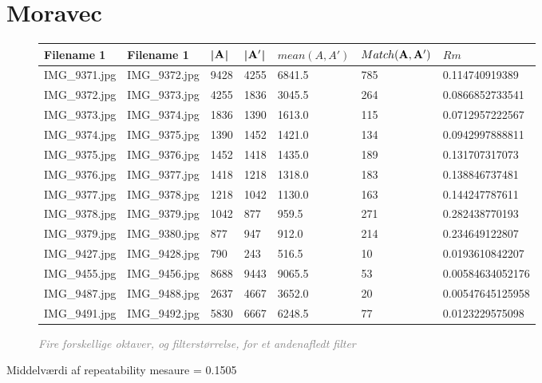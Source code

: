 \section{Moravec}
\begin{figure}[H]
    \centering
    \begin{center}    
    \begin{tabular}{ | l | l | l | l | l | l | l |}
    \hline
    Filename 1 & Filename 1 & |$\bold{A}$| & |$\bold{A'}$| & $mean(A,A')$ & $Match(\bold{A}, \bold{A}')$ & $Rm$ \\ \hline
IMG\_9371.jpg &	IMG\_9372.jpg &	9428 &	4255 &	6841.5 &	785 &	0.114740919389\\ \hline
IMG\_9372.jpg &	IMG\_9373.jpg &	4255 &	1836 &	3045.5 &	264 &	0.0866852733541\\ \hline
IMG\_9373.jpg &	IMG\_9374.jpg &	1836 &	1390 &	1613.0 &	115 &	0.0712957222567\\ \hline
IMG\_9374.jpg &	IMG\_9375.jpg &	1390 &	1452 &	1421.0 &	134 &	0.0942997888811\\ \hline
IMG\_9375.jpg &	IMG\_9376.jpg &	1452 &	1418 &	1435.0 &	189 &	0.131707317073\\ \hline
IMG\_9376.jpg &	IMG\_9377.jpg &	1418 &	1218 &	1318.0 &	183 &	0.138846737481\\ \hline
IMG\_9377.jpg &	IMG\_9378.jpg &	1218 &	1042 &	1130.0 &	163 &	0.144247787611\\ \hline
IMG\_9378.jpg &	IMG\_9379.jpg &	1042 &	877 &	959.5 &	271 &	0.282438770193\\ \hline
IMG\_9379.jpg &	IMG\_9380.jpg &	877 &	947 &	912.0 &	214 &	0.234649122807\\ \hline
IMG\_9427.jpg &	IMG\_9428.jpg &	790 &	243 &	516.5 &	10 &	0.0193610842207\\ \hline
IMG\_9455.jpg &	IMG\_9456.jpg &	8688 &	9443 &	9065.5 &	53 &	0.00584634052176\\ \hline
IMG\_9487.jpg &	IMG\_9488.jpg &	2637 &	4667 &	3652.0 &	20 &	0.00547645125958\\ \hline
IMG\_9491.jpg &	IMG\_9492.jpg &	5830 &	6667 &	6248.5 &	77 &	0.0123229575098\\ \hline
    \end{tabular}       
    \caption{\textcolor{gray}{\footnotesize \textit{Fire forskellige oktaver, og filterstørrelse, for et andenafledt filter}}}
    \label{tab:HARRISOCTAVE2}
     \end{center}
     \vspace{-2.5em}
\end{figure} \noindent
Middelværdi af repeatability mesaure  = 0.1505





